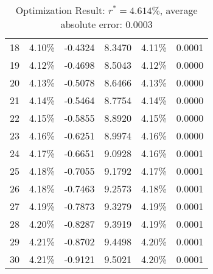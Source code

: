 \begin{table}[!htbp]
\begin{tabular}{@{}cccccc@{}}
18       & 4.10\%        & -0.4324 & 8.3470 & 4.11\%       & 0.0001         \\
19       & 4.12\%        & -0.4698 & 8.5043 & 4.12\%       & 0.0000         \\
20       & 4.13\%        & -0.5078 & 8.6466 & 4.13\%       & 0.0000         \\
21       & 4.14\%        & -0.5464 & 8.7754 & 4.14\%       & 0.0000         \\
22       & 4.15\%        & -0.5855 & 8.8920 & 4.15\%       & 0.0000         \\
23       & 4.16\%        & -0.6251 & 8.9974 & 4.16\%       & 0.0000         \\
24       & 4.17\%        & -0.6651 & 9.0928 & 4.16\%       & 0.0001         \\
25       & 4.18\%        & -0.7055 & 9.1792 & 4.17\%       & 0.0001         \\
26       & 4.18\%        & -0.7463 & 9.2573 & 4.18\%       & 0.0001         \\
27       & 4.19\%        & -0.7873 & 9.3279 & 4.19\%       & 0.0001         \\
28       & 4.20\%        & -0.8287 & 9.3919 & 4.19\%       & 0.0001         \\
29       & 4.21\%        & -0.8702 & 9.4498 & 4.20\%       & 0.0001         \\
30       & 4.21\%        & -0.9121 & 9.5021 & 4.20\%       & 0.0001         \\ \bottomrule
\end{tabular}
\caption{Optimization Result: $r^* = 4.614\%$, average absolute error: 0.0003}
\label{tab:prob4-result}
\end{table}
